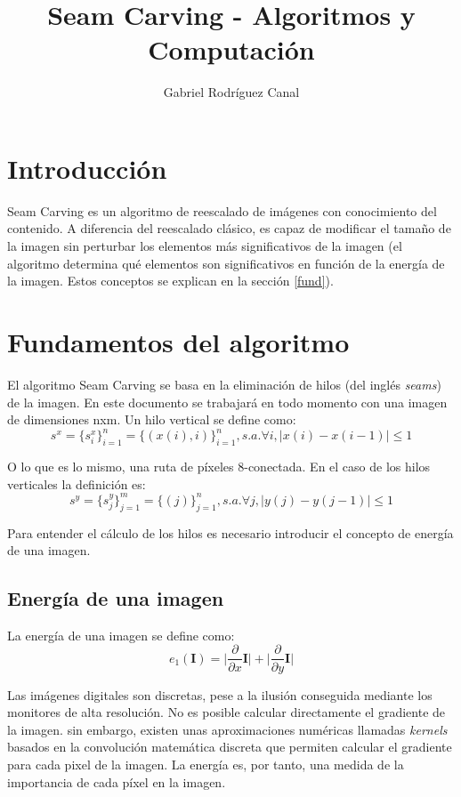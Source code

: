 \documentclass[11pt,a4paper,oneside]{article}
\author{Gabriel Rodríguez Canal}
\title{Seam Carving - Algoritmos y Computación}
\providecommand{\abs}[1]{\lvert#1\rvert}
\begin{document}
\maketitle

\section{Introducción}

Seam Carving es un algoritmo de reescalado de imágenes con conocimiento del contenido.
A diferencia del reescalado clásico, es capaz de modificar el tamaño de la imagen sin
perturbar los elementos más significativos de la imagen (el algoritmo determina qué
elementos son significativos en función de la energía de la imagen. Estos conceptos se
explican en la sección \ref{fund}).

\section{Fundamentos del algoritmo\label{fund}}
El algoritmo Seam Carving se basa en la eliminación de hilos (del inglés
\textit{seams}) de la imagen. En este documento se trabajará en todo momento con una
imagen de dimensiones nxm. Un hilo vertical se define como:
\begin{equation}
    s^x = \{s_i^x\}_{i=1}^n = \{(x(i),i)\}_{i=1}^n, s.a.  \forall i, \abs{x(i)-x(i-1)} \leq 1
    \label{hseam}
\end{equation}

O lo que es lo mismo, una ruta de píxeles 8-conectada. En el caso de los hilos verticales
la definición es:
\begin{equation}
    s^y = \{s_j^y\}_{j=1}^m = \{(j)\}_{j=1}^n, s.a.  \forall j, \abs{y(j)-y(j-1)} \leq 1
    \label{vseam}
\end{equation}

Para entender el cálculo de los hilos es necesario introducir el concepto de energía de
una imagen.

\subsection{Energía de una imagen}
La energía de una imagen se define como:
\begin{equation}
    e_1(\textbf{I}) = \abs{\frac{\partial}{\partial x} \textbf{I}} + \abs{\frac{\partial}{\partial y} \textbf{I}}
\end{equation}

Las imágenes digitales son discretas, pese a la ilusión conseguida mediante los monitores
de alta resolución. No es posible calcular directamente el gradiente de la imagen. sin
embargo, existen unas aproximaciones numéricas llamadas \textit{kernels} basados en la
convolución matemática discreta que permiten calcular el gradiente para cada pixel de la
imagen. La energía es, por tanto, una medida de la importancia de cada píxel en la imagen.
\end{document}
